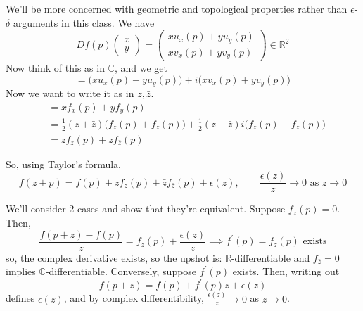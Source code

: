 	We'll be more concerned with geometric and topological properties rather than $\epsilon$-$\delta$ arguments in this class. We have 
	\begin{equation}
		Df(p) \begin{pmatrix} x \\ y \end{pmatrix} = \begin{pmatrix} x u_x (p) + y u_y (p) \\ x v_x (p) + y v_y (p) \end{pmatrix} \in \mathbb{R}^2
	\end{equation}
	Now think of this as in $\mathbb{C}$, and we get 
	\begin{equation}
	  = \big(x u_x (p) + y u_y (p) \big) + i \big( x v_x (p) + y v_y (p) \big)
	\end{equation}
	Now we want to write it as in $z, \bar{z}$.  
	\begin{align}
		& = x f_x (p) + y f_y (p) \\ 
		& = \frac{1}{2} (z + \bar{z}) \big( f_z (p) + f_{\bar{z}} (p) \big) + \frac{1}{2} (z - \bar{z}) i \big( f_z(p) - f_{\bar{z}} (p) \big) \\ 
		& = z f_z (p) + \bar{z} f_{\bar{z}} (p)
	\end{align}

	So, using Taylor's formula, 
	\begin{equation}
		f(z + p) = f(p) + z f_z (p) + \bar{z} f_{\bar{z}} (p) + \epsilon(z), \qquad \frac{\epsilon(z)}{z} \to 0 \text{ as } z \to 0
	\end{equation}

	We'll consider 2 cases and show that they're equivalent. Suppose $f_z (p) = 0$. Then, 
	\begin{equation}
		\frac{f(p + z) - f(p)}{z} = f_z (p) + \frac{\epsilon(z)}{z} \implies f^\prime (p) = f_z (p) \text{ exists}
	\end{equation}
	so, the complex derivative exists, so the upshot is: $\mathbb{R}$-differentiable and $f_{\bar{z}} = 0$ implies $\mathbb{C}$-differentiable. Conversely, suppose $f^\prime (p)$ exists. Then, writing out 
	\begin{equation}
	  f(p + z) = f(p) + f^\prime (p) z + \epsilon(z)
	\end{equation}
	defines $\epsilon(z)$, and by complex differentibility, $\frac{\epsilon(z)}{z} \to 0$ as $z \to 0$. 

